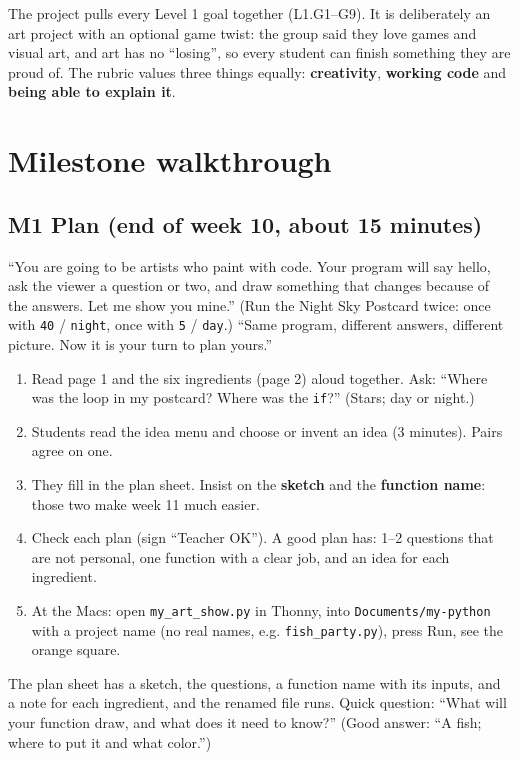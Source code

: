 \documentclass[level=1,teacher]{kidscode}
\begin{document}
\begin{teachernote}
The project pulls every Level 1 goal together (L1.G1--G9). It is deliberately an art project with
an optional game twist: the group said they love games and visual art, and art has no
\enquote{losing}, so every student can finish something they are proud of. The rubric values three
things equally: \textbf{creativity}, \textbf{working code} and \textbf{being able to explain it}.
\end{teachernote}

\section{Milestone walkthrough}

\subsection{M1 Plan (end of week 10, about 15 minutes)}
\begin{teacherscript}
\enquote{You are going to be artists who paint with code. Your program will say hello, ask the
viewer a question or two, and draw something that changes because of the answers. Let me show
you mine.} (Run the Night Sky Postcard twice: once with \texttt{40} / \texttt{night}, once with
\texttt{5} / \texttt{day}.) \enquote{Same program, different answers, different picture. Now it is
your turn to plan yours.}
\end{teacherscript}
\begin{enumerate}[itemsep=2pt]
  \item Read page 1 and the six ingredients (page 2) aloud together. Ask: \enquote{Where was the
        loop in my postcard? Where was the \texttt{if}?} (Stars; day or night.)
  \item Students read the idea menu and choose or invent an idea (3 minutes). Pairs agree on one.
  \item They fill in the plan sheet. Insist on the \textbf{sketch} and the \textbf{function name}:
        those two make week 11 much easier.
  \item Check each plan (sign \enquote{Teacher OK}). A good plan has: 1--2 questions that are not
        personal, one function with a clear job, and an idea for each ingredient.
  \item At the Macs: open \texttt{my\_art\_show.py} in Thonny,  into \texttt{Documents/my-python} with a project
        name (no real names, e.g. \texttt{fish\_party.py}), press Run, see the orange square.
\end{enumerate}
\begin{formativecheck}
The plan sheet has a sketch, the questions, a function name with its inputs, and a note for each
ingredient, and the renamed file runs. Quick question: \enquote{What will your function draw, and
what does it need to know?} (Good answer: \enquote{A fish; where to put it and what color.})
\end{formativecheck}
\end{document}
